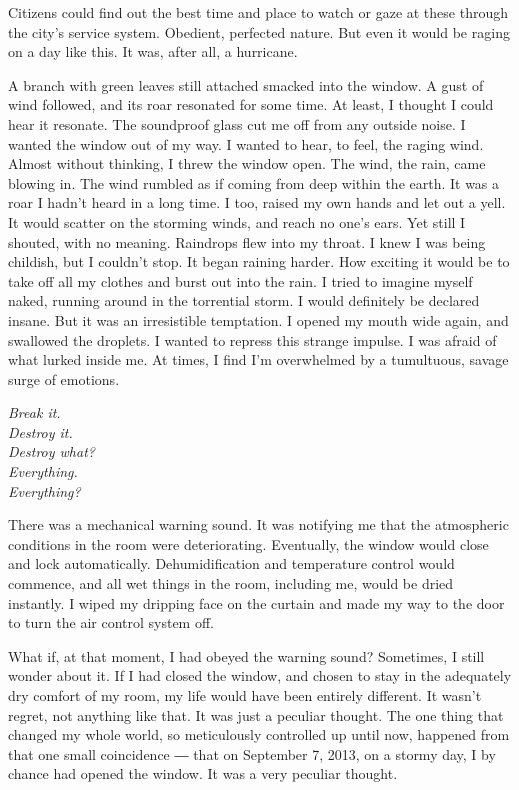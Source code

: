 Citizens could find out the best time and place to watch or gaze at
these through the city's service system. Obedient, perfected nature. But
even it would be raging on a day like this. It was, after all, a
hurricane.

A branch with green leaves still attached smacked into the window. A
gust of wind followed, and its roar resonated for some time. At least, I
thought I could hear it resonate. The soundproof glass cut me off from
any outside noise. I wanted the window out of my way. I wanted to hear,
to feel, the raging wind. Almost without thinking, I threw the window
open. The wind, the rain, came blowing in. The wind rumbled as if coming
from deep within the earth. It was a roar I hadn't heard in a long time.
I too, raised my own hands and let out a yell. It would scatter on the
storming winds, and reach no one's ears. Yet still I shouted, with no
meaning. Raindrops flew into my throat. I knew I was being childish, but
I couldn't stop. It began raining harder. How exciting it would be to
take off all my clothes and burst out into the rain. I tried to imagine
myself naked, running around in the torrential storm. I would definitely
be declared insane. But it was an irresistible temptation. I opened my
mouth wide again, and swallowed the droplets. I wanted to repress this
strange impulse. I was afraid of what lurked inside me. At times, I find
I'm overwhelmed by a tumultuous, savage surge of emotions.

\myspace

\emph{Break it.\\
	Destroy it.\\
	Destroy what?\\
	Everything.\\
	Everything?}

\myspace

There was a mechanical warning sound. It was notifying me that the
atmospheric conditions in the room were deteriorating. Eventually, the
window would close and lock automatically. Dehumidification and
temperature control would commence, and all wet things in the room,
including me, would be dried instantly. I wiped my dripping face on the
curtain and made my way to the door to turn the air control system off.

What if, at that moment, I had obeyed the warning sound? Sometimes, I
still wonder about it. If I had closed the window, and chosen to stay in
the adequately dry comfort of my room, my life would have been entirely
different. It wasn't regret, not anything like that. It was just a
peculiar thought. The one thing that changed my whole world, so
meticulously controlled up until now, happened from that one small
coincidence ― that on September 7, 2013, on a stormy day, I by chance
had opened the window. It was a very peculiar thought.

